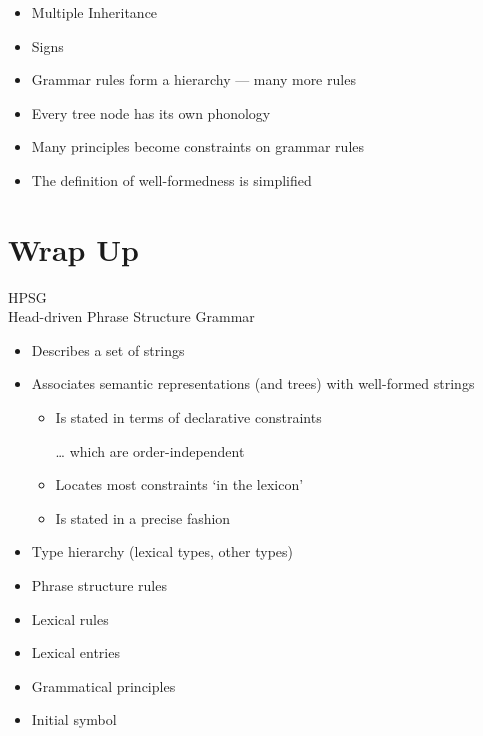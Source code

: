 \documentclass[a4paper,landscape,headrule,footrule,dvips]{foils}
\begin{document}

\begin{itemize}
\item Multiple Inheritance
\item Signs
\item Grammar rules form a hierarchy --- many more rules
\item Every tree node has its own phonology
\item Many principles become constraints on 
grammar rules
\item The definition of well-formedness is 
simplified
\end{itemize}




\section{Wrap Up}

\begin{center}
  \LARGE HPSG \\
  \Large Head-driven Phrase Structure Grammar  
\end{center}

\begin{itemize}
\item Describes a set of strings
\item Associates semantic representations (and
trees) with well-formed strings
\begin{itemize}
\item Is stated in terms of declarative constraints
\item[\ldots]  which are order-independent
\item Locates most constraints `in the lexicon'
\item Is stated in a precise fashion
\end{itemize}
\end{itemize}


\begin{itemize}
\item Type hierarchy (lexical types, other types)
\item Phrase structure rules
\item Lexical rules
\item Lexical entries
\item Grammatical principles
\item Initial symbol
\end{itemize}
\end{document}
